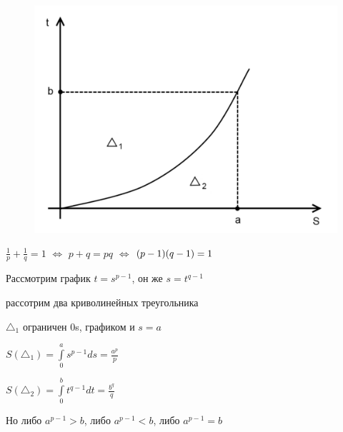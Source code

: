 \documentclass[a4paper]{report}
\newcommand*{\hm}[1]{#1\nobreak\discretionary{}%
            {\hbox{$\mathsurround=0pt #1$}}{}}
\begin{document}
\begin{figure} 
\includegraphics[width=\linewidth]{5}
\end{figure}

$\frac1p+\frac1q=1$ $\Leftrightarrow$ $p+q=pq$ $\Leftrightarrow$ $(p\hm-1)(q-1)=1$

Рассмотрим график $t=s^{p-1}$, он же $s=t^{q-1}$

рассотрим два криволинейных треугольника

$\triangle_1$ ограничен 0s, графиком и $s=a$

$S(\triangle_1)=\displaystyle\int\limits_0^a s^{p-1}ds=\frac{a^p}{p}$

$S(\triangle_2)=\displaystyle\int\limits_0^b t^{q-1}dt=\frac{b^q}{q}$

Но либо $a^{p-1}>b$, либо $a^{p-1}<b$, либо $a^{p-1}=b$
\end{document}
